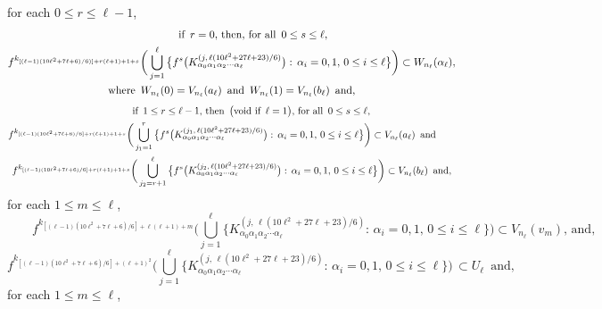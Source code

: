 \documentclass[12pt]{article}
\newcommand{\al}{\alpha}
\begin{document}
\noindent
for each $0 \le r \le \ell-1$, 
\begin{multline*}
$$
\qquad\qquad \text{if} \,\,\, r = 0, \, \text{then}, \, \text{for all} \,\,\, 0 \le s \le \ell, \\
f^{k_{[(\ell-1)(10\ell^2+7\ell+6)/6)]+r(\ell+1)+1+s}}\bigg(\bigcup_{j=1}^\ell \big\{ f^s\big(K_{\al_0\al_1\al_2\cdots\al_\ell}^{(j,\,\ell(10\ell^2+27\ell+23)/6)}\big): \, \al_i = 0, 1, \, 0 \le i \le \ell \big\}\bigg) \subset W_{n_\ell}(\al_\ell), \\
\text{where} \,\,\, W_{n_\ell}(0) = V_{n_\ell}(a_\ell) \,\,\, \text{and} \,\,\, W_{n_\ell}(1) = V_{n_\ell}(b_\ell) \,\,\, \text{and},
$$
\end{multline*}
\begin{multline*}
$$
\qquad\qquad \text{if} \,\,\, 1 \le r \le \ell-1, \, \text{then} \,\,\, \big(\text{void if} \,\,\, \ell = 1\big), \, \text{for all} \,\,\, 0 \le s \le \ell, \\
f^{k_{[(\ell-1)(10\ell^2+7\ell+6)/6]+r(\ell+1)+1+s}}\bigg(\bigcup_{j_1=1}^r \big\{ f^s\big(K_{\al_0\al_1\al_2\cdots\al_\ell}^{(j_1,\,\ell(10\ell^2+27\ell+23)/6)}\big): \, \al_i = 0, 1, \, 0 \le i \le \ell \big\}\bigg) \subset V_{n_\ell}(a_\ell) \,\,\, \text{and} \qquad \\ 
f^{k_{[(\ell-1)(10\ell^2+7\ell+6)/6]+r(\ell+1)+1+s}}\bigg(\bigcup_{j_2=r+1}^\ell \big\{ f^s\big(K_{\al_0\al_1\al_2\cdots\al_\ell}^{(j_2,\,\ell(10\ell^2+27\ell+23)/6)}\big): \, \al_i = 0, 1, \, 0 \le i \le \ell \big\}\bigg) \subset V_{n_\ell}(b_\ell) \,\,\, \text{and},
$$
\end{multline*}
for each $1 \le m \le \ell$, 
$$
\qquad f^{k_{[(\ell-1)(10\ell^2+7\ell+6)/6]+\ell(\ell+1)+m}}\bigg(\bigcup_{j=1}^\ell \big\{ K_{\al_0\al_1\al_2\cdots\al_\ell}^{(j, \,\ell(10\ell^2+27\ell+23)/6)}: \, \al_i = 0, 1, \, 0 \le i \le \ell \big\}\bigg) 
\subset V_{n_\ell}(v_m),\, \text{and},
$$
$$
f^{k_{[(\ell-1)(10\ell^2+7\ell+6)/6]+(\ell+1)^2}}\bigg(\bigcup_{j=1}^\ell \big\{ K_{\al_0\al_1\al_2\cdots\al_\ell}^{(j, \,\ell(10\ell^2+27\ell+23)/6)}: \, \al_i = 0, 1, \, 0 \le i \le \ell \big\}\bigg) \, \subset U_\ell \,\,\, \text{and}, \qquad\qquad\quad\,\,
$$
for each $1 \le m \le \ell$,  
\end{document}
